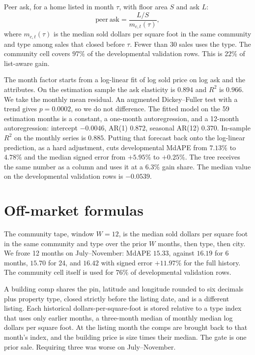 \documentclass[11pt]{article}
\begin{document}
Peer ask, for a home listed in month \(\tau\), with floor area \(S\) and ask \(L\):
\[
\mathrm{peer\ ask} = \frac{L/S}{m_{c,t}(\tau)},
\]
where \(m_{c,t}(\tau)\) is the median sold dollars per square foot in the same community and type among sales that closed before \(\tau\). Fewer than 30 sales uses the type. The community cell covers \(97\%\) of the developmental validation rows. This is \(22\%\) of list-aware gain.

The month factor starts from a log-linear fit of log sold price on log ask and the attributes. On the estimation sample the ask elasticity is \(0.894\) and \(R^2\) is \(0.966\). We take the monthly mean residual. An augmented Dickey--Fuller test with a trend gives \(p=0.0002\), so we do not difference. The fitted model on the 59 estimation months is a constant, a one-month autoregression, and a 12-month autoregression: intercept \(-0.0046\), AR(1) \(0.872\), seasonal AR(12) \(0.370\). In-sample \(R^2\) on the monthly series is \(0.885\). Putting that forecast back onto the log-linear prediction, as a hard adjustment, cuts developmental MdAPE from \(7.13\%\) to \(4.78\%\) and the median signed error from \(+5.95\%\) to \(+0.25\%\). The tree receives the same number as a column and uses it at a \(6.3\%\) gain share. The median value on the developmental validation rows is \(-0.0539\).

\section{Off-market formulas}
\label{app:om}

The community tape, window \(W=12\), is the median sold dollars per square foot in the same community and type over the prior \(W\) months, then type, then city. We froze 12 months on July--November: MdAPE \(15.33\), against \(16.19\) for 6 months, \(15.70\) for 24, and \(16.42\) with signed error \(+11.97\%\) for the full history. The community cell itself is used for \(76\%\) of developmental validation rows.

A building comp shares the pin, latitude and longitude rounded to six decimals plus property type, closed strictly before the listing date, and is a different listing. Each historical dollars-per-square-foot is stored relative to a type index that uses only earlier months, a three-month median of monthly median log dollars per square foot. At the listing month the comps are brought back to that month's index, and the building price is size times their median. The gate is one prior sale. Requiring three was worse on July--November.
\end{document}
